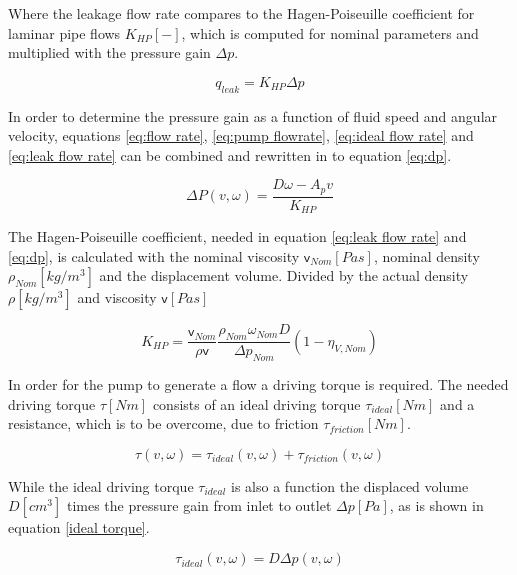 \noindent Where the leakage flow rate compares to the Hagen-Poiseuille coefficient for laminar pipe flows $ K_{HP} [-] $, which is computed for nominal parameters and multiplied with the pressure gain $ \Delta p $.
\begin{sBox}
	\begin{equation}\label{eq:leak flow rate}
		q_{leak} = K_{HP} \Delta p
	\end{equation}
\end{sBox}

\noindent In order to determine the pressure gain as a function of fluid speed and angular velocity, equations \ref{eq:flow rate}, \ref{eq:pump flowrate}, \ref{eq:ideal flow rate} and \ref{eq:leak flow rate} can be combined and rewritten in to equation \ref{eq:dp}.
\begin{sBox}
	\begin{equation}\label{eq:dp}
		\Delta P(v, \omega) = \frac{D \omega - A_{p} v}{K_{HP}}
	\end{equation}
\end{sBox}

\noindent The Hagen-Poiseuille coefficient, needed in equation \ref{eq:leak flow rate} and \ref{eq:dp}, is calculated with the nominal viscosity $ \mathsf{v}_{Nom} \left[Pa s\right] $, nominal density $ \rho_{Nom} \left[kg/m^3\right]$  and the displacement volume. Divided by the actual density $ \rho \left[kg/m^3\right] $ and viscosity $  \mathsf{v} \left[Pa s\right] $

\begin{sBox}
	\begin{equation}
	K_{HP} = \frac{\mathsf{v}_{Nom}}{\rho \mathsf{v}} \frac{\rho_{Nom} \omega_{Nom} D}{\Delta p_{Nom}} \left(1 - \eta_{V,Nom}\right)
	\end{equation}
\end{sBox}

\noindent In order for the pump to generate a flow a driving torque is required. The needed driving torque $ \tau [Nm] $ consists of an ideal driving torque $ \tau_{ideal} [Nm] $ and a resistance, which is to be overcome, due to friction $ \tau_{friction} [Nm] $.

\begin{sBox}
	\begin{equation}
	\tau(v, \omega) = \tau_{ideal}(v, \omega) + \tau_{friction}(v, \omega)
	\end{equation}
\end{sBox}

\noindent While the ideal driving torque $ \tau_{ideal} $ is also a function the displaced volume $ D [cm^3] $ times the pressure gain from inlet to outlet $ \Delta p [Pa] $, as is shown in equation \ref{ideal torque}.
\begin{sBox}
	\begin{equation}\label{ideal torque}
		\tau_{ideal}(v, \omega) = D \Delta p(v, \omega)
	\end{equation}
\end{sBox}

